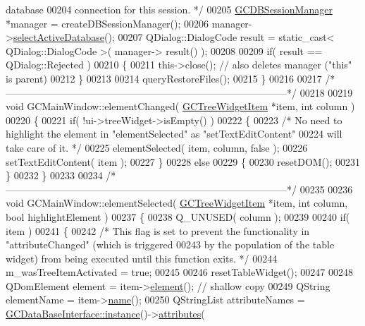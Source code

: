 \begin{DoxyCode}
{       database}
00204 \textcolor{comment}{    connection for this session. */}
00205   \hyperlink{class_g_c_d_b_session_manager}{GCDBSessionManager} *manager = createDBSessionManager();
00206   manager->\hyperlink{class_g_c_d_b_session_manager_ac4e5a25619ee77bc9307d3428bfd345d}{selectActiveDatabase}();
00207   QDialog::DialogCode result = \textcolor{keyword}{static\_cast<} QDialog::DialogCode \textcolor{keyword}{>}( manager->
      result() );
00208 
00209   \textcolor{keywordflow}{if}( result == QDialog::Rejected )
00210   \{
00211     this->close();    \textcolor{comment}{// also deletes manager ("this" is parent)}
00212   \}
00213 
00214   queryRestoreFiles();
00215 \}
00216 
00217 \textcolor{comment}{/*
      --------------------------------------------------------------------------------------*/}
00218 
00219 \textcolor{keywordtype}{void} GCMainWindow::elementChanged( \hyperlink{class_g_c_tree_widget_item}{GCTreeWidgetItem} *item, \textcolor{keywordtype}{int} column )
00220 \{
00221   \textcolor{keywordflow}{if}( !ui->treeWidget->isEmpty() )
00222   \{
00223     \textcolor{comment}{/* No need to highlight the element in "elementSelected" as
       "setTextEditContent"}
00224 \textcolor{comment}{      will take care of it. */}
00225     elementSelected( item, column, \textcolor{keyword}{false} );
00226     setTextEditContent( item );
00227   \}
00228   \textcolor{keywordflow}{else}
00229   \{
00230     resetDOM();
00231   \}
00232 \}
00233 
00234 \textcolor{comment}{/*
      --------------------------------------------------------------------------------------*/}
00235 
00236 \textcolor{keywordtype}{void} GCMainWindow::elementSelected( \hyperlink{class_g_c_tree_widget_item}{GCTreeWidgetItem} *item, \textcolor{keywordtype}{int} column, \textcolor{keywordtype}{bool} 
      highlightElement )
00237 \{
00238   Q\_UNUSED( column );
00239 
00240   \textcolor{keywordflow}{if}( item )
00241   \{
00242     \textcolor{comment}{/* This flag is set to prevent the functionality in "attributeChanged"
       (which is triggered}
00243 \textcolor{comment}{    by the population of the table widget) from being executed until this
       function exits. */}
00244     m\_wasTreeItemActivated = \textcolor{keyword}{true};
00245 
00246     resetTableWidget();
00247 
00248     QDomElement element = item->\hyperlink{class_g_c_tree_widget_item_a584cad866bdbd94710d31eb77b804d84}{element}();      \textcolor{comment}{// shallow copy}
00249     QString elementName = item->\hyperlink{class_g_c_tree_widget_item_a3af8c66a690cd55986a38b996a375ba4}{name}();
00250     QStringList attributeNames = \hyperlink{class_g_c_data_base_interface_a1baea9c0667aa8b610ec30076fcab84c}{GCDataBaseInterface::instance}()->\hyperlink{class_g_c_data_base_interface_afb1e49e08f98ca453f9ac66340a35642}{attributes}( 

\end{DoxyCode}
